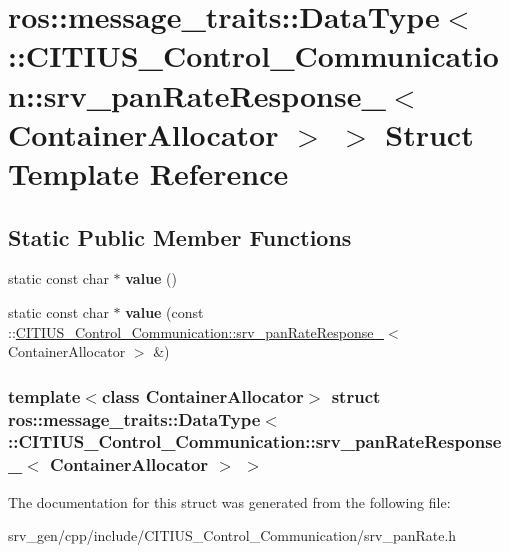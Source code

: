 \hypertarget{structros_1_1message__traits_1_1_data_type_3_01_1_1_c_i_t_i_u_s___control___communication_1_1srvd5f4ef275cda7c6e75e6ae52da88f330}{\section{ros\-:\-:message\-\_\-traits\-:\-:\-Data\-Type$<$ \-:\-:\-C\-I\-T\-I\-U\-S\-\_\-\-Control\-\_\-\-Communication\-:\-:srv\-\_\-pan\-Rate\-Response\-\_\-$<$ \-Container\-Allocator $>$ $>$ \-Struct \-Template \-Reference}
\label{structros_1_1message__traits_1_1_data_type_3_01_1_1_c_i_t_i_u_s___control___communication_1_1srvd5f4ef275cda7c6e75e6ae52da88f330}
}
\subsection*{\-Static \-Public \-Member \-Functions}
\begin{DoxyCompactItemize}
\item 
\hypertarget{structros_1_1message__traits_1_1_data_type_3_01_1_1_c_i_t_i_u_s___control___communication_1_1srvd5f4ef275cda7c6e75e6ae52da88f330_ab505d740f34e0bbab7acc75039486f0f}{static const char $\ast$ {\bfseries value} ()}\label{structros_1_1message__traits_1_1_data_type_3_01_1_1_c_i_t_i_u_s___control___communication_1_1srvd5f4ef275cda7c6e75e6ae52da88f330_ab505d740f34e0bbab7acc75039486f0f}

\item 
\hypertarget{structros_1_1message__traits_1_1_data_type_3_01_1_1_c_i_t_i_u_s___control___communication_1_1srvd5f4ef275cda7c6e75e6ae52da88f330_ac58ba808edeeb985405d266c59272b97}{static const char $\ast$ {\bfseries value} (const \-::\hyperlink{struct_c_i_t_i_u_s___control___communication_1_1srv__pan_rate_response__}{\-C\-I\-T\-I\-U\-S\-\_\-\-Control\-\_\-\-Communication\-::srv\-\_\-pan\-Rate\-Response\-\_\-}$<$ \-Container\-Allocator $>$ \&)}\label{structros_1_1message__traits_1_1_data_type_3_01_1_1_c_i_t_i_u_s___control___communication_1_1srvd5f4ef275cda7c6e75e6ae52da88f330_ac58ba808edeeb985405d266c59272b97}

\end{DoxyCompactItemize}
\subsubsection*{template$<$class Container\-Allocator$>$ struct ros\-::message\-\_\-traits\-::\-Data\-Type$<$ \-::\-C\-I\-T\-I\-U\-S\-\_\-\-Control\-\_\-\-Communication\-::srv\-\_\-pan\-Rate\-Response\-\_\-$<$ Container\-Allocator $>$ $>$}



\-The documentation for this struct was generated from the following file\-:\begin{DoxyCompactItemize}
\item 
srv\-\_\-gen/cpp/include/\-C\-I\-T\-I\-U\-S\-\_\-\-Control\-\_\-\-Communication/srv\-\_\-pan\-Rate.\-h\end{DoxyCompactItemize}
